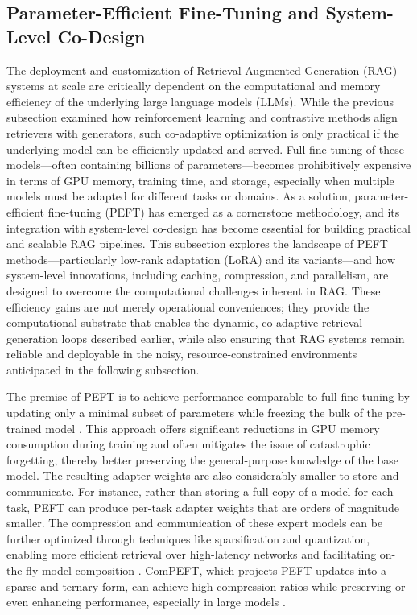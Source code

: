\documentclass[11pt]{article}
\begin{document}
\subsection{Parameter-Efficient Fine-Tuning and System-Level Co-Design}

The deployment and customization of Retrieval-Augmented Generation (RAG) systems at scale are critically dependent on the computational and memory efficiency of the underlying large language models (LLMs). While the previous subsection examined how reinforcement learning and contrastive methods align retrievers with generators, such co-adaptive optimization is only practical if the underlying model can be efficiently updated and served. Full fine-tuning of these models---often containing billions of parameters---becomes prohibitively expensive in terms of GPU memory, training time, and storage, especially when multiple models must be adapted for different tasks or domains. As a solution, parameter-efficient fine-tuning (PEFT) has emerged as a cornerstone methodology, and its integration with system-level co-design has become essential for building practical and scalable RAG pipelines. This subsection explores the landscape of PEFT methods---particularly low-rank adaptation (LoRA) and its variants---and how system-level innovations, including caching, compression, and parallelism, are designed to overcome the computational challenges inherent in RAG. These efficiency gains are not merely operational conveniences; they provide the computational substrate that enables the dynamic, co-adaptive retrieval--generation loops described earlier, while also ensuring that RAG systems remain reliable and deployable in the noisy, resource-constrained environments anticipated in the following subsection.

The premise of PEFT is to achieve performance comparable to full fine-tuning by updating only a minimal subset of parameters while freezing the bulk of the pre-trained model \cite{ref86}. This approach offers significant reductions in GPU memory consumption during training and often mitigates the issue of catastrophic forgetting, thereby better preserving the general-purpose knowledge of the base model. The resulting adapter weights are also considerably smaller to store and communicate. For instance, rather than storing a full copy of a model for each task, PEFT can produce per-task adapter weights that are orders of magnitude smaller. The compression and communication of these expert models can be further optimized through techniques like sparsification and quantization, enabling more efficient retrieval over high-latency networks and facilitating on-the-fly model composition \cite{ref87}. ComPEFT, which projects PEFT updates into a sparse and ternary form, can achieve high compression ratios while preserving or even enhancing performance, especially in large models \cite{ref88}.
\end{document}
